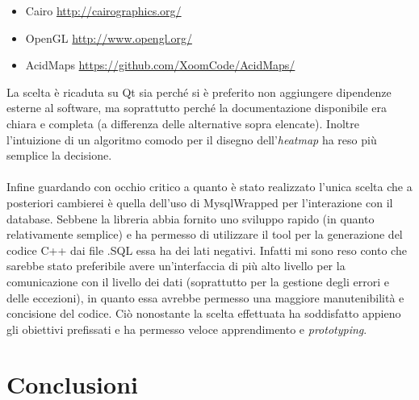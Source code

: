 \documentclass[a4paper,13pt,twoside]{article}
\begin{document}
\begin{itemize}
	\item Cairo \url{http://cairographics.org/}
	\item OpenGL \url{http://www.opengl.org/}
	\item AcidMaps \url{https://github.com/XoomCode/AcidMaps/}
\end{itemize}
La scelta è ricaduta su Qt sia perché si è preferito non aggiungere dipendenze esterne al software, ma soprattutto perché la documentazione disponibile era chiara e completa (a differenza delle alternative sopra elencate). Inoltre l'intuizione di un algoritmo comodo per il disegno  dell'\textit{heatmap} ha reso più semplice la decisione. \\ \\
Infine guardando con occhio critico a quanto è stato realizzato l'unica scelta che a posteriori cambierei è quella dell'uso di MysqlWrapped per l'interazione con il database. Sebbene la libreria abbia fornito uno sviluppo rapido (in quanto relativamente semplice) e ha permesso di utilizzare il tool per la generazione del codice C++ dai file .SQL essa ha dei lati negativi. Infatti mi sono reso conto che sarebbe stato preferibile avere un'interfaccia di più alto livello per la comunicazione con il livello dei dati (soprattutto per la gestione degli errori e delle eccezioni), in quanto essa avrebbe permesso una maggiore manutenibilità e concisione del codice. Ciò nonostante la scelta effettuata ha soddisfatto appieno gli obiettivi prefissati e ha permesso veloce apprendimento e \textit{prototyping}.

\newpage
\section{Conclusioni}

\newpage

%
%


%

\appendix
%
%
%
\end{document}
